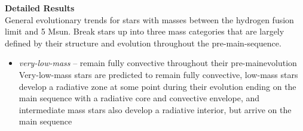 \textbf{Detailed Results} \\
General evolutionary trends for stars with masses between the hydrogen fusion limit and 5 Msun. Break stars up into three mass categories that are largely defined by their structure and evolution throughout the pre-main-sequence. 
\begin{itemize}
 \item[] {\it very-low-mass} -- remain fully convective throughout their pre-mainevolution
Very-low-mass stars are predicted to remain fully convective, 
low-mass stars develop a radiative zone at some point during their evolution ending on the main sequence with a radiative core and convective envelope, and intermediate mass stars also develop a radiative interior, but arrive on the main sequence
\end{itemize}